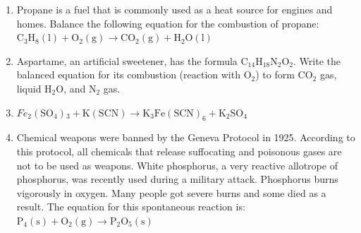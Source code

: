       
      \label{m38727*id67334}\begin{enumerate}[noitemsep, label=\textbf{\arabic*}. ] 
            \label{m38727*uid45}\item Propane is a fuel that is commonly used as a heat source for engines and homes. Balance the following equation for the combustion of propane:
        \begin{math}{\mathrm{C}}_{3}{\mathrm{H}}_{8}\left(\mathrm{l}\right)+\mathrm{O}{}_{2}\left(\mathrm{g}\right)\to \mathrm{CO}{}_{2}\left(\mathrm{g}\right)+\mathrm{H}{}_{2}\mathrm{O}\left(\mathrm{l}\right)\end{math}
        \label{m38727*uid46}\item Aspartame, an artificial sweetener, has the formula \begin{math}{\mathrm{C}}_{14}{\mathrm{H}}_{18}{\mathrm{N}}_{2}{\mathrm{O}}_{2}\end{math}. Write the balanced equation for its combustion (reaction with \begin{math}{\mathrm{O}}_{2}\end{math}) to form \begin{math}{\mathrm{CO}}_{2}\end{math} gas, liquid \begin{math}\mathrm{H}{}_{2}\mathrm{O}\end{math}, and \begin{math}{\mathrm{N}}_{2}\end{math} gas.
        \label{m38727*uid47}\item 
\begin{math}{Fe}_{2}\left({\mathrm{SO}}_{4}\right){}_{3}+\mathrm{K\left(SCN\right)}\to {\mathrm{K}}_{3}{\mathrm{Fe\left(SCN\right)}}_{6}+{\mathrm{K}}_{2}{\mathrm{SO}}_{4}\end{math}
                \label{m38727*uid48}\item Chemical weapons were banned by the Geneva Protocol in 1925. According to this protocol, all chemicals that release suffocating and poisonous gases are not to be used as weapons. White phosphorus, a very reactive allotrope of phosphorus, was recently used during a military attack. Phosphorus burns vigorously in oxygen. Many people got severe burns and some died as a result. The equation for this spontaneous reaction is:
        \begin{math}{\mathrm{P}}_{4}\left(\mathrm{s}\right)+{\mathrm{O}}_{2}\left(\mathrm{g}\right)\to {\mathrm{P}}_{2}{\mathrm{O}}_{5}\left(\mathrm{s}\right)\end{math}\label{m38727*id67821}\begin{enumerate}[noitemsep, label=\textbf{\alph*}. ] 

\end{enumerate}
\end{enumerate}

